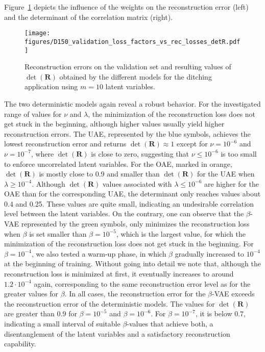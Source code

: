 Figure~\ref{fig:D150_loss_factors_vs_rec_losses_detR} depicts the influence of the weights on the reconstruction error (left) and the determinant of the correlation matrix (right).
%
\begin{figure}[h!]
    \centering
    \texttt{[image: figures/D150\_validation\_loss\_factors\_vs\_rec\_losses\_detR.pdf]}
    \caption{Reconstruction errors on the validation set and resulting values of $\det(\mathbf{R})$ obtained by the different models for the ditching application using $m=10$ latent variables. 
    }
    \label{fig:D150_loss_factors_vs_rec_losses_detR}
\end{figure}
%
The two deterministic models again reveal a robust behavior. For the investigated range of values for $\nu$ and $\lambda$, the minimization of the reconstruction loss does not get stuck in the beginning, although higher values 
usually yield higher reconstruction errors. The UAE, represented by the blue symbols, achieves the lowest reconstruction error and returns $\det(\mathbf{R}) \approx 1$ except for $\nu=10^{-6}$ and $\nu=10^{-7}$, where $\det(\mathbf{R})$ is close to zero, suggesting that $\nu\le 10^{-6}$ is too small to enforce uncorrelated latent variables. For the OAE, marked in orange, $\det(\mathbf{R})$ is mostly close to 0.9 and smaller than $\det(\mathbf{R})$ for the UAE when $\lambda\ge10^{-4}$. Although  $\det(\mathbf{R})$ values associated with $\lambda\le10^{-6}$ are higher for the OAE than for the corresponding UAE, the determinant only reaches values about 0.4 and 0.25. These values are quite small, indicating an undesirable correlation level between the latent variables.
%
On the contrary, one can observe that the $\beta$-VAE represented by the green symbols, only minimizes the reconstruction loss when $\beta$ is set smaller than $\beta=10^{-5}$, 
 which is the largest value, for which the minimization of the reconstruction loss does not get stuck in the beginning. For $\beta=10^{-4}$, we also tested a warm-up phase, in which $\beta$ gradually increased to $10^{-4}$ at the beginning of training. Without going into detail we note that, although the reconstruction loss is minimized at first, it eventually increases to around $1.2\cdot10^{-4}$ again, corresponding to the same reconstruction error level as for the greater values for $\beta$.
In all cases, the reconstruction error for the $\beta$-VAE exceeds the reconstruction error of the deterministic models. 
The values for $\det(\mathbf{R})$ are greater than $0.9$ for $\beta=10^{-5}$ and $\beta=10^{-6}$. For $\beta=10^{-7}$, it is below $0.7$, indicating a small interval of suitable $\beta$-values that achieve both, a disentanglement of the latent variables and a satisfactory reconstruction capability.


